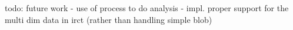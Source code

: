 todo: future work
- use of process to do analysis
- impl. proper support for the multi dim data in irct (rather than handling simple blob)